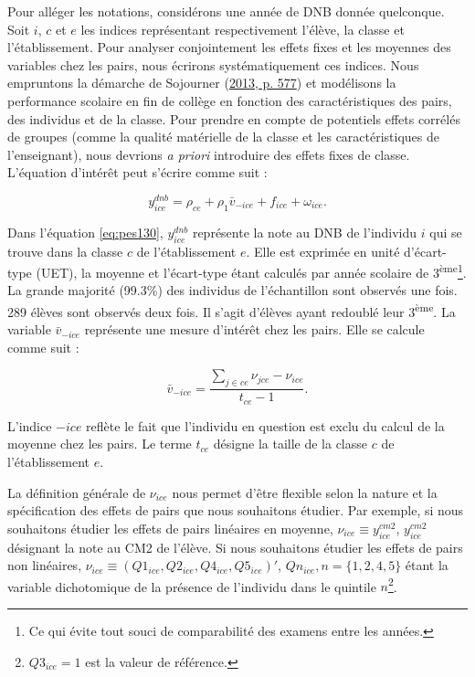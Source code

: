 \documentclass[
]{book}
\begin{document}
Pour alléger les notations, considérons une année de DNB donnée quelconque. Soit \(i\), \(c\) et \(e\) les indices représentant respectivement l'élève, la classe et l'établissement. Pour analyser conjointement les effets fixes et les moyennes des variables chez les pairs, nous écrirons systématiquement ces indices. Nous empruntons la démarche de Sojourner (\protect\hyperlink{ref-SOJ:13}{2013, p. 577}) et modélisons la performance scolaire en fin de collège en fonction des caractéristiques des pairs, des individus et de la classe. Pour prendre en compte de potentiels effets corrélés de groupes (comme la qualité matérielle de la classe et les caractéristiques de l'enseignant), nous devrions \emph{a priori} introduire des effets fixes de classe. L'équation d'intérêt peut s'écrire comme suit :

\begin{equation}
\label{eq:pes130}
y_{ice}^{dnb} = \rho_{ce} + \rho_1 \bar{v}_{-ice} + f_{ice} + \omega_{ice}.
\end{equation}

Dans l'équation \eqref{eq:pes130}, \(y^{dnb}_{ice}\) représente la note au DNB de l'individu \(i\) qui se trouve dans la classe \(c\) de l'établissement \(e\). Elle est exprimée en unité d'écart-type (UET), la moyenne et l'écart-type étant calculés par année scolaire de 3\textsuperscript{ème}\footnote{Ce qui évite tout souci de comparabilité des examens entre les années.}. La grande majorité (99.3\%) des individus de l'échantillon sont observés une fois. 289 élèves sont observés deux fois. Il s'agit d'élèves ayant redoublé leur 3\textsuperscript{ème}. La variable \(\bar{v}_{-ice}\) représente une mesure d'intérêt chez les pairs. Elle se calcule comme suit :

\[
\bar{v}_{-ice} = \frac{\displaystyle\sum_{j \in ce} \nu_{jce} - \nu_{ice}}{t_{ce} - 1}.
\]

L'indice \(-ice\) reflète le fait que l'individu en question est exclu du calcul de la moyenne chez les pairs. Le terme \(t_{ce}\) désigne la taille de la classe \(c\) de l'établissement \(e\).

\quad La définition générale de \(\nu_{ice}\) nous permet d'être flexible selon la nature et la spécification des effets de pairs que nous souhaitons étudier. Par exemple, si nous souhaitons étudier les effets de pairs linéaires en moyenne, \(\nu_{ice} \equiv y^{cm2}_{ice}\), \(y^{cm2}_{ice}\) désignant la note au CM2 de l'élève. Si nous souhaitons étudier les effets de pairs non linéaires, \(\nu_{ice} \equiv (Q1_{ice}, Q2_{ice}, Q4_{ice}, Q5_{ice})'\), \(Qn_{ice}, n = \{1, 2, 4, 5\}\) étant la variable dichotomique de la présence de l'individu dans le quintile \(n\)\footnote{\(Q3_{ice} = 1\) est la valeur de référence.}.
\end{document}
